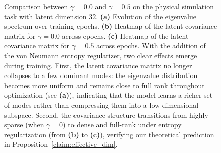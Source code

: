 \documentclass{article} %
\begin{document}
\begin{figure}[t]
    \caption{Comparison between $\gamma = 0.0$ and $\gamma = 0.5$ on the physical simulation task with latent dimension $32$.
\textbf{(a)} Evolution of the eigenvalue spectrum over training epochs.
\textbf{(b)} Heatmap of the latent covariance matrix for $\gamma = 0.0$ across epochs.
\textbf{(c)} Heatmap of the latent covariance matrix for $\gamma = 0.5$ across epochs.
With the addition of the von Neumann entropy regularizer, two clear effects emerge during training.
First, the latent covariance matrix no longer collapses to a few dominant modes: the eigenvalue distribution becomes more uniform and remains close to full rank throughout optimization (see \textbf{(a)}), indicating that the model learns a richer set of modes rather than compressing them into a low-dimensional subspace.
Second, the covariance structure transitions from highly sparse (when $\gamma = 0$) to dense and full-rank under entropy regularization (from \textbf{(b)} to \textbf{(c)}), verifying our theoretical prediction in Proposition~\ref{claim:effective_dim}.}
\end{figure}
\end{document}
